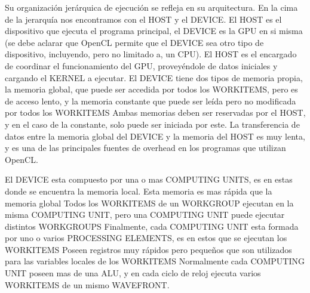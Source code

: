Su organización jerárquica de ejecución se refleja en su arquitectura. En la
cima de la jerarquía nos encontramos con el HOST y el DEVICE. El HOST es el
dispositivo que ejecuta el programa principal, el DEVICE es la GPU en si misma
(se debe aclarar que OpenCL permite que el DEVICE sea otro tipo de dispositivo,
incluyendo, pero no limitado a, un CPU). El HOST es el encargado de coordinar el
funcionamiento del GPU, proveyéndole de datos iniciales y cargando el KERNEL a
ejecutar. El DEVICE tiene dos tipos de memoria propia, la memoria global, que
puede ser accedida por todos los WORKITEMS, pero es de acceso lento, y la
memoria constante que puede ser leída pero no modificada por todos los WORKITEMS
Ambas memorias deben ser reservadas por el HOST, y en el caso de la constante,
solo puede ser iniciada por este. La transferencia de datos entre la memoria
global del DEVICE y la memoria del HOST es muy lenta, y es una de las
principales fuentes de overhead en los programas que utilizan OpenCL.

El DEVICE esta compuesto por una o mas COMPUTING UNITS, es en estas donde se
encuentra la memoria local. Esta memoria es mas rápida que la memoria global
Todos los WORKITEMS de un WORKGROUP ejecutan en la misma COMPUTING UNIT, pero
una COMPUTING UNIT puede ejecutar distintos WORKGROUPS Finalmente, cada
COMPUTING UNIT esta formada por uno o varios PROCESSING ELEMENTS, es en estos
que se ejecutan los WORKITEMS Poseen registros muy rápidos pero pequeños que son
utilizados para las variables locales de los WORKITEMS Normalmente cada
COMPUTING UNIT poseen mas de una ALU, y en cada ciclo de reloj ejecuta varios
WORKITEMS de un mismo WAVEFRONT.
